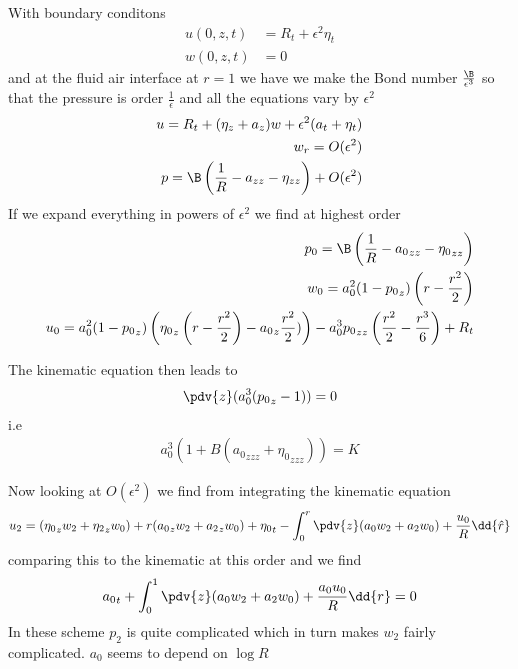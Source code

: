 \documentclass[12pt]{article}
\begin{document}
With boundary conditons
\begin{align}
u(0,z,t) &= R_t+\epsilon^2\eta_t\\
w(0,z,t) &= 0 
\end{align}
and at the fluid air interface at $r = 1$ we have we make the Bond number $\frac{\B}{\epsilon^3}$ so that the pressure is order $\frac{1}{\epsilon}$ and all the equations vary by $\epsilon^2$
\begin{align}
u = R_t + (\eta_z +a_z)w + \epsilon^2(a_t + \eta_t)\\
w_r = O(\epsilon^2)\\
p = \B \left(\frac{1}{R}-a_{zz} -\eta_{zz}\right)+ O(\epsilon^2)
\end{align}
If we expand everything in powers of $\epsilon^2$ we find at highest order
\begin{align}
p_0 = \B\left(\frac{1}{R} - {a_0}_{zz} - {\eta_0}_{zz}\right)\\
w_0 = a_0^2(1-{p_0}_z)\left(r-\frac{r^2}{2}\right)\\
u_0 = a_0^2(1-{p_0}_z)\left({\eta_0}_z\left(r-\frac{r^2}{2}\right)-{a_0}_z\frac{r^2}{2})\right)-a_0^3{p_0}_{zz}\left(\frac{r^2}{2}-\frac{r^3}{6}\right)+R_t
\end{align}

The kinematic equation then leads to
\begin{align} \pdv{z} (a_0^{3}({p_0}_z-1))=0
\end{align}
i.e
\begin{align}
a_0^3(1+ B({a_0}_{zzz}+{\eta_0}_{zzz}))=K
\end{align}

Now looking at $O(\epsilon^2)$ we find from integrating the kinematic equation
\begin{align}
u_2 = ({\eta_0}_zw_2+{\eta_2}_zw_0)+ r({a_0}_zw_2+{a_2}_zw_0)+{\eta_0}_t - \int_{0}^{r}{\pdv{z}(a_0w_2+a_2w_0) +\frac{u_0}{R} \dd{\hat r}}
\end{align}
comparing this to the kinematic at this order and we find
\begin{align}
{a_0}_t+\int_0^1{\pdv{z}(a_0w_2+a_2w_0)+\frac{a_0u_0}{R}\dd{r}}=0
\end{align}
In these scheme $p_2$ is quite complicated which in turn makes $w_2$ fairly complicated. 
 $a_0$ seems to depend on $\log R$
\end{document}
